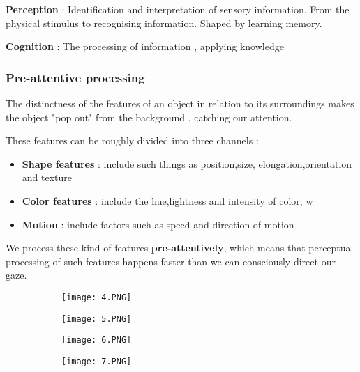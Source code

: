 \documentclass{article}
\begin{document}
\textbf{Perception} : Identification and interpretation of sensory information. From the physical stimulus to recognising information. Shaped by learning memory.

\textbf{Cognition} : The processing of information , applying knowledge

\subsubsection{Pre-attentive processing}

The distinctness of the features of an object in relation to its surroundings makes the object "pop out" from the background , catching our attention.

These features can be roughly divided into three channels : 

\begin{itemize}
    \item \textbf{Shape features} : include such things as position,size, elongation,orientation and texture
    \item \textbf{Color features} : include the hue,lightness and intensity  of color, w
    \item \textbf{Motion} : include factors such as speed and direction of motion
\end{itemize}

We process these kind of features \textbf{pre-attentively}, which means that perceptual processing of such features happens faster than we can consciously direct our gaze.

\begin{figure}[ht!]
  \centering
  \begin{subfigure}[b]{0.5\linewidth}
    \texttt{[image: 4.PNG]}
  \end{subfigure}
     \begin{subfigure}[b]{0.49\textwidth}
         \centering
         \texttt{[image: 5.PNG]}
     \end{subfigure}
\end{figure}

\begin{figure}[ht!]
  \centering
  \begin{subfigure}[b]{0.5\linewidth}
    \texttt{[image: 6.PNG]}
  \end{subfigure}
     \begin{subfigure}[b]{0.49\textwidth}
         \centering
         \texttt{[image: 7.PNG]}
     \end{subfigure}
\end{figure}
\end{document}
